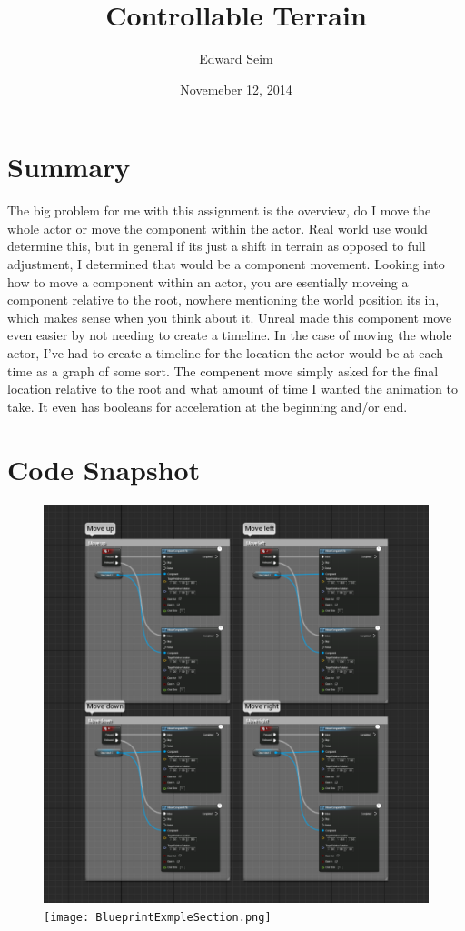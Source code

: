 \documentclass[a4paper]{article}
\title{Controllable Terrain}
\author{Edward Seim}
\date{Novemeber 12, 2014}
\begin{document}
\maketitle

\section{Summary}

The big problem for me with this assignment is the overview, do I move the whole actor or move the component within the actor. Real world use would determine this, but in general if its just a shift in terrain as opposed to full adjustment, I determined that would be a component movement. Looking into how to move a component within an actor, you are esentially moveing a component relative to the root, nowhere mentioning the world position its in, which makes sense when you think about it. Unreal made this component move even easier by not needing to create a timeline. In the case of moving the whole actor, I've had to create a timeline for the location the actor would be at each time as a graph of some sort. The compenent move simply asked for the final location relative to the root and what amount of time I wanted the animation to take. It even has booleans for acceleration at the beginning and/or end.

\section{Code Snapshot}

\begin{figure}
\centering
\includegraphics[keepaspectratio=true, scale=.4]{BlueprintOverview.png}
\texttt{[image: BlueprintExmpleSection.png]}
\end{figure}
\end{document}
